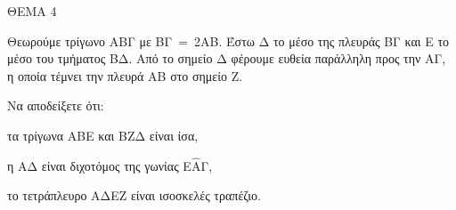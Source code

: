 
ΘΕΜΑ 4

Θεωρούμε τρίγωνο ΑΒΓ με ΒΓ$\  = \ $2ΑΒ. Έστω Δ το μέσο της πλευράς ΒΓ και Ε το μέσο του τμήματος ΒΔ. Από το σημείο Δ φέρουμε ευθεία παράλληλη προς την ΑΓ, η οποία τέμνει την πλευρά ΑΒ στο σημείο Ζ.

Να αποδείξετε ότι:

\begin{alist}
\item τα τρίγωνα ΑΒΕ και ΒΖΔ είναι ίσα, 

\item η ΑΔ είναι διχοτόμος της γωνίας Ε$\widehat{\text{Α}}$Γ, 

\item το τετράπλευρο ΑΔΕΖ είναι ισοσκελές τραπέζιο. 
\end{alist}
